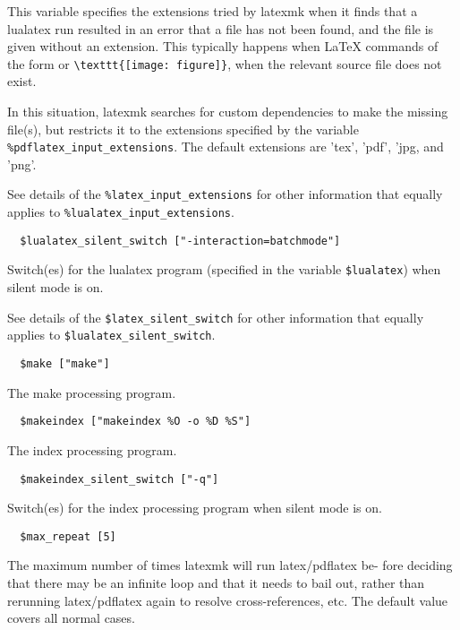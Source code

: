 This  variable specifies the extensions tried by latexmk when it finds that a
lualatex run resulted in an error that a  file  has not  been  found,  and  the
file is given without an extension.  This typically happens when LaTeX
commands  of  the  form  \verb||  or
\verb|\texttt{[image: figure]}|, when the relevant source file does not exist.

In this situation, latexmk searches for custom  dependencies  to make  the
missing  file(s),  but restricts it to the extensions specified by the variable
\verb|%pdflatex_input_extensions|.   The  default extensions are 'tex', 'pdf',
'jpg, and 'png'.

See details of the \verb|%latex_input_extensions| for other information
that equally applies to \verb|%lualatex_input_extensions|.

\begin{verbatim}
  $lualatex_silent_switch ["-interaction=batchmode"]
\end{verbatim}

Switch(es) for the lualatex program (specified in  the  variable
\verb|$lualatex|) when silent mode is on.

See  details  of  the \verb|$latex_silent_switch| for other information
that equally applies to \verb|$lualatex_silent_switch|.

\begin{verbatim}
  $make ["make"]
\end{verbatim}

The make processing program.

\begin{verbatim}
  $makeindex ["makeindex %O -o %D %S"]
\end{verbatim}

The index processing program.

\begin{verbatim}
  $makeindex_silent_switch ["-q"]
\end{verbatim}

Switch(es) for the index processing program when silent mode  is
on.

\begin{verbatim}
  $max_repeat [5]
\end{verbatim}

The  maximum number of times latexmk will run latex/pdflatex be-
fore deciding that there may be an infinite  loop  and  that  it
needs to bail out, rather than rerunning latex/pdflatex again to
resolve cross-references, etc.  The  default  value  covers  all
normal cases.

